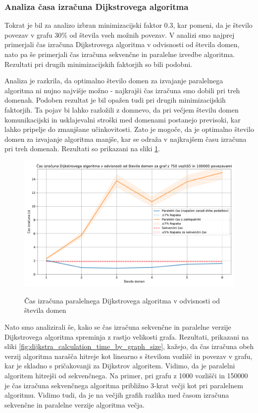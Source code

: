 \documentclass[mat1, tisk]{fmfdelo}
\begin{document}
\subsubsection{Analiza časa izračuna Dijkstrovega algoritma}

Tokrat je bil za analizo izbran minimizacijski faktor 0.3, kar pomeni, da je število povezav v grafu 30\% od števila vseh
možnih povezav. V analizi smo najprej primerjali čas izračuna Dijkstrovega algoritma v odvisnosti od števila domen,
nato pa še primerjali čas izračuna sekvenčne in paralelne izvedbe algoritma. Rezultati pri drugih minimizacijskih
faktorjih so bili podobni.

Analiza je razkrila, da optimalno število domen za izvajanje paralelnega algoritma ni nujno najvišje možno - najkrajši
čas izračuna smo dobili pri treh domenah. Podoben rezultat je bil opažen tudi pri drugih minimizacijskih faktorjih.
Ta pojav bi lahko razložili z domnevo, da pri večjem številu domen komunikacijski in usklajevalni stroški med domenami
postanejo previsoki, kar lahko pripelje do zmanjšane učinkovitosti. Zato je mogoče, da je optimalno število domen za
izvajanje algoritma manjše, kar se odraža v najkrajšem času izračuna pri treh domenah. 
Rezultati so prikazani na sliki \ref{fig:dijkstra_calculation_time_by_num_domains}.

\begin{figure}[h!]
  \centering
  \caption{Čas izračuna paralelnega Dijkstrovega algoritma v odvisnosti od števila domen}
  \includegraphics[width=15cm]{slike/dijkstra_v_odvisnosti_od_stevila_domen.pdf}
  \label{fig:dijkstra_calculation_time_by_num_domains}
\end{figure}

Nato smo analizirali še, kako se čas izračuna sekvenčne in paralelne verzije Dijkstrovega algoritma spreminja z rastjo
velikosti grafa. Rezultati, prikazani na sliki \ref{fig:dijkstra_calculation_time_by_graph_size}, kažejo, da čas izračuna
obeh verzij algoritma narašča hitreje kot linearno s številom vozlišč in povezav v grafu, kar je skladno s pričakovanji
za Dijkstrov algoritem. Vidimo, da je paralelni algoritem hitrejši od sekvenčnega. Na primer, pri grafu z 1000 vozlišči
in 150000 je čas izračuna sekvenčnega algoritma približno 3-krat večji kot pri paralelnem algoritmu. Vidimo tudi, da je
na večjih grafih razlika med časom izračuna sekvenčne in paralelne verzije algoritma večja.  
\end{document}
